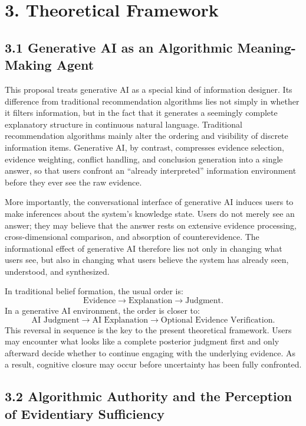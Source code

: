 \section*{3. Theoretical Framework}

\subsection*{3.1 Generative AI as an Algorithmic Meaning-Making Agent}

This proposal treats generative AI as a special kind of information designer. Its difference from traditional recommendation algorithms lies not simply in whether it filters information, but in the fact that it generates a seemingly complete explanatory structure in continuous natural language. Traditional recommendation algorithms mainly alter the ordering and visibility of discrete information items. Generative AI, by contrast, compresses evidence selection, evidence weighting, conflict handling, and conclusion generation into a single answer, so that users confront an ``already interpreted'' information environment before they ever see the raw evidence.

More importantly, the conversational interface of generative AI induces users to make inferences about the system's knowledge state. Users do not merely see an answer; they may believe that the answer rests on extensive evidence processing, cross-dimensional comparison, and absorption of counterevidence. The informational effect of generative AI therefore lies not only in changing what users see, but also in changing what users believe the system has already seen, understood, and synthesized.

In traditional belief formation, the usual order is:
\[
\text{Evidence} \rightarrow \text{Explanation} \rightarrow \text{Judgment}.
\]
In a generative AI environment, the order is closer to:
\[
\text{AI Judgment} \rightarrow \text{AI Explanation} \rightarrow \text{Optional Evidence Verification}.
\]
This reversal in sequence is the key to the present theoretical framework. Users may encounter what looks like a complete posterior judgment first and only afterward decide whether to continue engaging with the underlying evidence. As a result, cognitive closure may occur before uncertainty has been fully confronted.

\subsection*{3.2 Algorithmic Authority and the Perception of Evidentiary Sufficiency}

